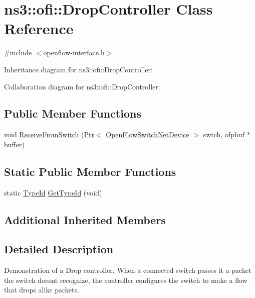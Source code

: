 \hypertarget{classns3_1_1ofi_1_1DropController}{}\section{ns3\+:\+:ofi\+:\+:Drop\+Controller Class Reference}
\label{classns3_1_1ofi_1_1DropController}


{\ttfamily \#include $<$openflow-\/interface.\+h$>$}



Inheritance diagram for ns3\+:\+:ofi\+:\+:Drop\+Controller\+:


Collaboration diagram for ns3\+:\+:ofi\+:\+:Drop\+Controller\+:
\subsection*{Public Member Functions}
\begin{DoxyCompactItemize}
\item 
void \hyperlink{classns3_1_1ofi_1_1DropController_a1d70593ec36fcefc3a51b24b3846f749}{Receive\+From\+Switch} (\hyperlink{classns3_1_1Ptr}{Ptr}$<$ \hyperlink{classns3_1_1OpenFlowSwitchNetDevice}{Open\+Flow\+Switch\+Net\+Device} $>$ swtch, ofpbuf $\ast$buffer)
\end{DoxyCompactItemize}
\subsection*{Static Public Member Functions}
\begin{DoxyCompactItemize}
\item 
static \hyperlink{classns3_1_1TypeId}{Type\+Id} \hyperlink{classns3_1_1ofi_1_1DropController_ac5cc5cc1958ff5ed7dd6430a5a0e3c7c}{Get\+Type\+Id} (void)
\end{DoxyCompactItemize}
\subsection*{Additional Inherited Members}


\subsection{Detailed Description}
Demonstration of a Drop controller. When a connected switch passes it a packet the switch doesn\textquotesingle{}t recognize, the controller configures the switch to make a flow that drops alike packets. 

